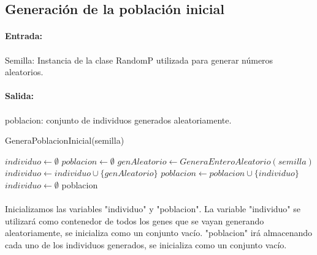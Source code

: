 	\subsection{Generación de la población inicial}
	
	\paragraph{Entrada:}
	
	\paragraph{}Semilla: Instancia de la clase RandomP utilizada para generar números aleatorios.
	
	\paragraph{Salida:}
	
	\paragraph{}poblacion: conjunto de individuos generados aleatoriamente.
	\begin{algorithm}[H]
		\caption{GeneraPoblacionInicial(semilla)}
		\begin{algorithmic}
			\STATE $individuo \leftarrow \emptyset$
			\STATE $poblacion \leftarrow \emptyset$
					\STATE $genAleatorio \leftarrow GeneraEnteroAleatorio(semilla)$
						\STATE $individuo \leftarrow individuo\cup\{genAleatorio\}$
					\ENDIF
				\ENDWHILE
				\STATE $poblacion \leftarrow poblacion\cup\{individuo\}$
				\STATE $individuo \leftarrow \emptyset$
				\ENDWHILE
			\RETURN poblacion
		\end{algorithmic}
	\end{algorithm}

	\paragraph{}Inicializamos las variables "individuo" y "poblacion". La variable "individuo" se utilizará como contenedor de todos los genes que se vayan generando aleatoriamente, se inicializa como un conjunto vacío. "poblacion" irá almacenando cada uno de los individuos generados, se inicializa como un conjunto vacío.
	
